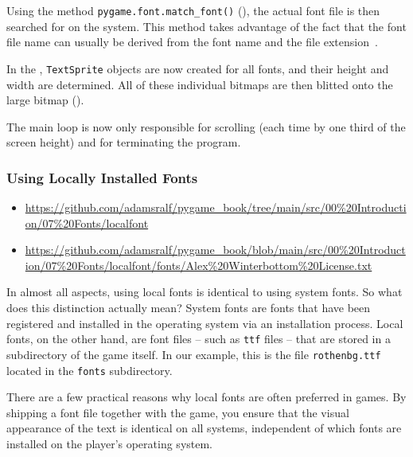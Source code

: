 Using the method \texttt{pygame.font.match\_font()} (), the actual font file is then searched for on the system. This method takes advantage of the fact that the font file name can usually be derived from the font name and the file extension~.


In the \forSchleife{}, \texttt{TextSprite} objects are now created for all fonts, and their height and width are determined. All of these individual bitmaps are then blitted onto the large bitmap ().

The main loop is now only responsible for scrolling (each time by one third of the screen height) and for terminating the program.

\subsubsection{Using Locally Installed Fonts}
\begin{diskbox}
	\begin{itemize}
		\item \url{https://github.com/adamsralf/pygame_book/tree/main/src/00%20Introduction/07%20Fonts/localfont}
		\item \url{https://github.com/adamsralf/pygame_book/blob/main/src/00%20Introduction/07%20Fonts/localfont/fonts/Alex%20Winterbottom%20License.txt}
	\end{itemize}
\end{diskbox}

In almost all aspects, using local fonts is identical to using system fonts. So what does this distinction actually mean? System fonts are fonts that have been registered and installed in the operating system via an installation process. Local fonts, on the other hand, are font files -- such as \texttt{ttf} files -- that are stored in a subdirectory of the game itself. In our example, this is the file \texttt{rothenbg.ttf} located in the \texttt{fonts} subdirectory.

There are a few practical reasons why local fonts are often preferred in games. By shipping a font file together with the game, you ensure that the visual appearance of the text is identical on all systems, independent of which fonts are installed on the player’s operating system.

